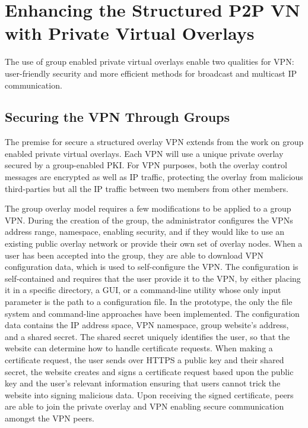 \section{Enhancing the Structured P2P VN with Private Virtual Overlays}
The use of group enabled private virtual overlays enable two qualities for
VPN:  user-friendly security and more efficient methods for broadcast and
multicast IP communication.

\subsection{Securing the VPN Through Groups}
\label{groupvpn}
The premise for secure a structured overlay VPN extends from the work on
group enabled private virtual overlays.  Each VPN will use a unique private
overlay secured by a group-enabled PKI.  For VPN purposes, both the overlay
control messages are encrypted as well as IP traffic, protecting the overlay
from malicious third-parties but all the IP traffic between two members from
other members.

The group overlay model requires a few modifications to be applied to a group
VPN.  During the creation of the group, the administrator configures the VPNs
address range, namespace, enabling security, and if they would like to use an
existing public overlay network or provide their own set of overlay nodes.
When a user has been accepted into the group, they are able to download VPN
configuration data, which is used to self-configure the VPN.  The configuration
is self-contained and requires that the user provide it to the VPN, by either
placing it in a specific directory, a GUI, or a command-line utility whose only
input parameter is the path to a configuration file.  In the prototype, the
only the file system and command-line approaches have been implemented.  The
configuration data contains the IP address space, VPN namespace, group website's
address, and a shared secret.  The shared secret uniquely identifies the user,
so that the website can determine how to handle certificate requests.  When
making a certificate request, the user sends over HTTPS a public key and their
shared secret, the website creates and signs a certificate request based upon
the public key and the user's relevant information ensuring that users cannot
trick the website into signing malicious data.  Upon receiving the signed
certificate, peers are able to join the private overlay and VPN enabling
secure communication amongst the VPN peers.

